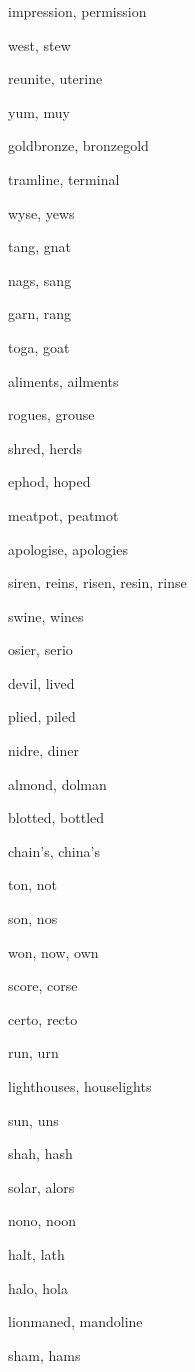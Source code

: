     \item impression, permission
    \item west, stew
    \item reunite, uterine
    \item yum, muy
    \item goldbronze, bronzegold
    \item tramline, terminal
    \item wyse, yews
    \item tang, gnat
    \item nags, sang
    \item garn, rang
    \item toga, goat
    \item aliments, ailments
    \item rogues, grouse
    \item shred, herds
    \item ephod, hoped
    \item meatpot, peatmot
    \item apologise, apologies
    \item siren, reins, risen, resin, rinse
    \item swine, wines
    \item osier, serio
    \item devil, lived
    \item plied, piled
    \item nidre, diner
    \item almond, dolman
    \item blotted, bottled
    \item chain's, china's
    \item ton, not
    \item son, nos
    \item won, now, own
    \item score, corse
    \item certo, recto
    \item run, urn
    \item lighthouses, houselights
    \item sun, uns
    \item shah, hash
    \item solar, alors
    \item nono, noon
    \item halt, lath
    \item halo, hola
    \item lionmaned, mandoline
    \item sham, hams
